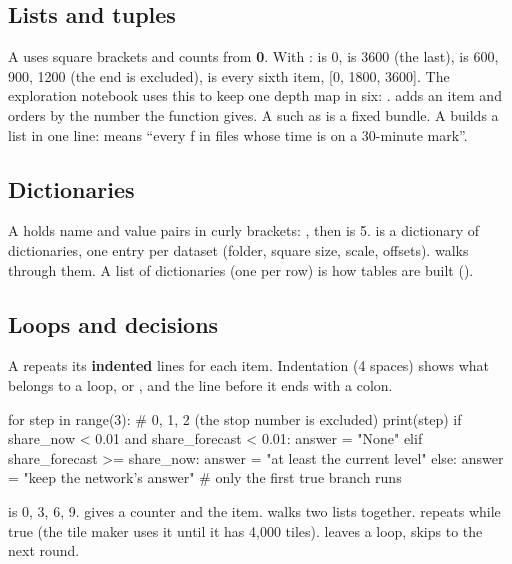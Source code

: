 \subsection{Lists and tuples}\label{py:lists}
A  uses square brackets and counts from \textbf{0}. With :  is 0,  is 3600 (the last),  is 600, 900, 1200 (the end is excluded),  is every sixth item, [0, 1800, 3600]. The exploration notebook uses this to keep one depth map in six: .  adds an item and  orders by the number the function gives. A  such as  is a fixed bundle. A  builds a list in one line: \cd{[f for f in files if get\_seconds(f) \% 1800 == 0]} means ``every f in files whose time is on a 30-minute mark''.

\subsection{Dictionaries}\label{py:dicts}
A  holds name and value pairs in curly brackets: , then  is 5.  is a dictionary of dictionaries, one entry per dataset (folder, square size, scale, offsets).  walks through them. A list of dictionaries (one per row) is how tables are built ().

\subsection{Loops and decisions}\label{py:loops}
A  repeats its \textbf{indented} lines for each item. Indentation (4 spaces) shows what belongs to a loop,  or , and the line before it ends with a colon.
\begin{pycode}
for step in range(3):                 # 0, 1, 2 (the stop number is excluded)
    print(step)
if share_now < 0.01 and share_forecast < 0.01:
    answer = "None"
elif share_forecast >= share_now:
    answer = "at least the current level"
else:
    answer = "keep the network's answer"    # only the first true branch runs
\end{pycode}
 is 0, 3, 6, 9.  gives a counter and the item.  walks two lists together.  repeats while true (the tile maker uses it until it has 4,000 tiles).  leaves a loop,  skips to the next round.

